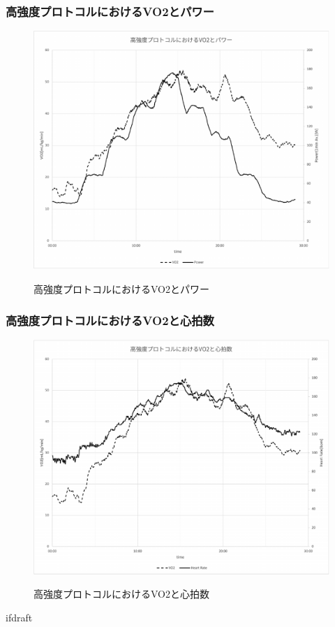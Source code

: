 \subsubsection{高強度プロトコルにおけるVO2とパワー}

\begin{figure}[H]
  \begin{center}
    \label{fig:hard_vo2_power}
    \includegraphics[width=12cm]{fig/hard_vo2_power}
    \caption{高強度プロトコルにおけるVO2とパワー}
  \end{center}
\end{figure}

\subsubsection{高強度プロトコルにおけるVO2と心拍数}

\begin{figure}[H]
  \begin{center}
    \label{fig:hard_vo2_hr}
    \includegraphics[width=12cm]{fig/hard_vo2_hr}
    \caption{高強度プロトコルにおけるVO2と心拍数}
  \end{center}
\end{figure}

\expandafter\ifx\csname ifdraft\endcsname\relax
  
\fi
